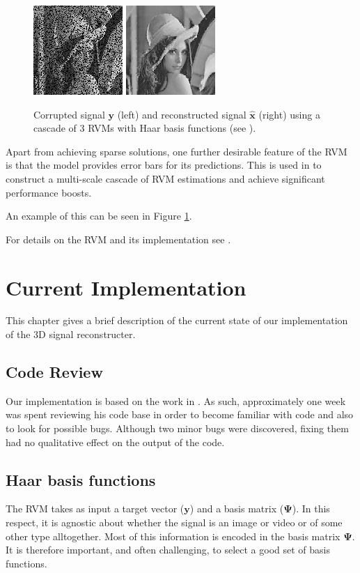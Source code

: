 \documentclass[final,3p]{report}
\let\bs\boldsymbol
\begin{document}
\begin{figure}
\label{fig:lennareconstruction}
\center
\includegraphics{0.png}
\includegraphics{3.png}
\caption{Corrupted signal $\bs y$ (left) and reconstructed signal $\hat{\bs x}$ (right) using a cascade of 3 RVMs with Haar basis functions (see \cite{pilikos2014}).}
\end{figure}

Apart from achieving sparse solutions, one further desirable feature of the RVM is that the model provides error bars for its predictions.
This is used in \cite{pilikos2014} to construct a multi-scale cascade of RVM estimations and achieve significant performance boosts.

An example of this can be seen in Figure \ref{fig:lennareconstruction}.

For details on the RVM and its implementation see \cite{pilikos2014,tipping2003,tipping2001}.


\chapter{Current Implementation}
This chapter gives a brief description of the current state of our implementation of the 3D signal reconstructer.

\section{Code Review}
Our implementation is based on the work in \cite{pilikos2014}.
As such, approximately one week was spent reviewing his code base in order to become familiar with code and also to look for possible bugs.
Although two minor bugs were discovered, fixing them had no qualitative effect on the output of the code.

\section{Haar basis functions}
The RVM takes as input a target vector ($\bs y$) and a basis matrix ($\bs \Psi$). 
In this respect, it is agnostic about whether the signal is an image or video or of some other type alltogether.
Most of this information is encoded in the basis matrix $\bs \Psi$.
It is therefore important, and often challenging, to select a good set of basis functions.
\end{document}
